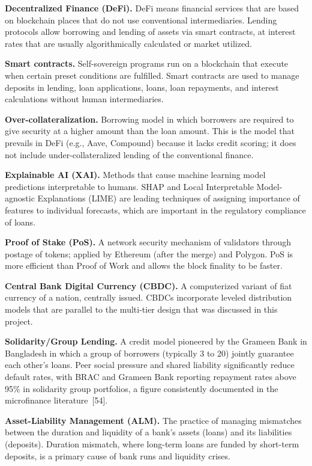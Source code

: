 \documentclass[12pt,a4paper]{report}
\begin{document}
\hangindent=0.5in \textbf{Decentralized Finance (DeFi).} DeFi means financial services that are based on blockchain places that do not use conventional intermediaries. Lending protocols allow borrowing and lending of assets via smart contracts, at interest rates that are usually algorithmically calculated or market utilized.

\hangindent=0.5in \textbf{Smart contracts.} Self-sovereign programs run on a blockchain that execute when certain preset conditions are fulfilled. Smart contracts are used to manage deposits in lending, loan applications, loans, loan repayments, and interest calculations without human intermediaries.

\hangindent=0.5in \textbf{Over-collateralization.} Borrowing model in which borrowers are required to give security at a higher amount than the loan amount. This is the model that prevails in DeFi (e.g., Aave, Compound) because it lacks credit scoring; it does not include under-collateralized lending of the conventional finance.

\hangindent=0.5in \textbf{Explainable AI (XAI).} Methods that cause machine learning model predictions interpretable to humans. SHAP and Local Interpretable Model-agnostic Explanations (LIME) are leading techniques of assigning importance of features to individual forecasts, which are important in the regulatory compliance of loans.

\hangindent=0.5in \textbf{Proof of Stake (PoS).} A network security mechanism of validators through postage of tokens; applied by Ethereum (after the merge) and Polygon. PoS is more efficient than Proof of Work and allows the block finality to be faster.

\hangindent=0.5in \textbf{Central Bank Digital Currency (CBDC).} A computerized variant of fiat currency of a nation, centrally issued. CBDCs incorporate leveled distribution models that are parallel to the multi-tier design that was discussed in this project.

\hangindent=0.5in \textbf{Solidarity/Group Lending.} A credit model pioneered by the Grameen Bank in Bangladesh in which a group of borrowers (typically 3 to 20) jointly guarantee each other's loans. Peer social pressure and shared liability significantly reduce default rates, with BRAC and Grameen Bank reporting repayment rates above 95\% in solidarity group portfolios, a figure consistently documented in the microfinance literature~[54].

\hangindent=0.5in \textbf{Asset-Liability Management (ALM).} The practice of managing mismatches between the duration and liquidity of a bank's assets (loans) and its liabilities (deposits). Duration mismatch, where long-term loans are funded by short-term deposits, is a primary cause of bank runs and liquidity crises.
\end{document}
